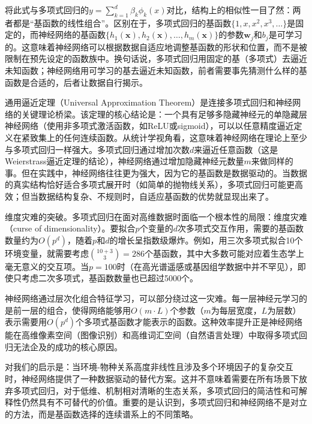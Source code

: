 \documentclass[
  twoside,12pt,fontset=none]{ctexbook}
\begin{document}
将此式与多项式回归的\(y = \sum_{k=1}^{d} \beta_k \phi_k(x)\)对比，结构上的相似性一目了然：两者都是``基函数的线性组合''。区别在于，多项式回归的基函数\(\{1, x, x^2, x^3, \ldots\}\)是固定的，而神经网络的基函数\(\{h_1(\mathbf{x}), h_2(\mathbf{x}), \ldots, h_m(\mathbf{x})\}\)的参数\(\mathbf{w}_j\)和\(b_j\)是可学习的。这意味着神经网络可以根据数据自适应地调整基函数的形状和位置，而不是被限制在预先设定的函数族中。换句话说，多项式回归用固定的基（多项式）去逼近未知函数；神经网络用可学习的基去逼近未知函数，前者需要事先猜测什么样的基函数是合适的，后者让数据自行揭示。

通用逼近定理（Universal Approximation Theorem）是连接多项式回归和神经网络的关键理论桥梁。该定理的核心结论是：一个具有足够多隐藏神经元的单隐藏层神经网络（使用非多项式激活函数，如ReLU或sigmoid），可以以任意精度逼近定义在紧致集上的任何连续函数。从统计学视角看，这意味着神经网络在理论上至少与多项式回归一样强大。多项式回归通过增加次数\(d\)来逼近任意函数（这是Weierstrass逼近定理的结论），神经网络通过增加隐藏神经元数量\(m\)来做同样的事。但在实践中，神经网络往往更为强大，因为它的基函数是数据驱动的。当数据的真实结构恰好适合多项式展开时（如简单的抛物线关系），多项式回归可能更高效；但当数据结构复杂、不规则时，自适应基函数的优势就显现出来了。

维度灾难的突破。多项式回归在面对高维数据时面临一个根本性的局限：维度灾难（curse of dimensionality）。要拟合\(p\)个变量的\(d\)次多项式交互作用，需要的基函数数量约为\(O(p^d)\)，随着\(p\)和\(d\)的增长呈指数级爆炸。例如，用三次多项式拟合10个环境变量，就需要考虑\(\binom{10+3}{3} = 286\)个基函数，其中大多数可能对应着生态学上毫无意义的交互项。当\(p=100\)时（在高光谱遥感或基因组学数据中并不罕见），即使只考虑二次多项式，基函数数量也已超过5000个。

神经网络通过层次化组合特征学习，可以部分绕过这一灾难。每一层神经元学习的是前一层的组合，使得网络能够用\(O(m \cdot L)\)个参数（\(m\)为每层宽度，\(L\)为层数）表示需要用\(O(p^d)\)个多项式基函数才能表示的函数。这种效率提升正是神经网络能在高维像素空间（图像识别）和高维词汇空间（自然语言处理）中取得多项式回归无法企及的成功的核心原因。

对我们的启示是：当环境-物种关系高度非线性且涉及多个环境因子的复杂交互时，神经网络提供了一种数据驱动的替代方案。这并不意味着需要在所有场景下放弃多项式回归，对于低维、机制相对清晰的生态关系，多项式回归的简洁性和可解释性仍然具有不可替代的价值。重要的是认识到，多项式回归和神经网络不是对立的方法，而是基函数选择的连续谱系上的不同策略。
\end{document}
